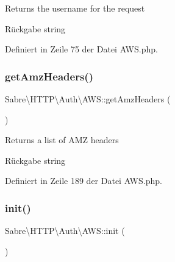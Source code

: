 Returns the username for the request

\begin{DoxyReturn}{Rückgabe}
string 
\end{DoxyReturn}


Definiert in Zeile 75 der Datei A\+W\+S.\+php.

\mbox{\label{class_sabre_1_1_h_t_t_p_1_1_auth_1_1_a_w_s_a05192193b8766a7524dbe902f0e52aba}} 
\subsubsection{\texorpdfstring{get\+Amz\+Headers()}{getAmzHeaders()}}
{\footnotesize\ttfamily Sabre\textbackslash{}\+H\+T\+T\+P\textbackslash{}\+Auth\textbackslash{}\+A\+W\+S\+::get\+Amz\+Headers (\begin{DoxyParamCaption}{ }\end{DoxyParamCaption})\hspace{0.3cm}{\ttfamily [protected]}}

Returns a list of A\+MZ headers

\begin{DoxyReturn}{Rückgabe}
string 
\end{DoxyReturn}


Definiert in Zeile 189 der Datei A\+W\+S.\+php.

\mbox{\label{class_sabre_1_1_h_t_t_p_1_1_auth_1_1_a_w_s_a71edb3d7a3ba008150032d53ccac6766}} 
\subsubsection{\texorpdfstring{init()}{init()}}
{\footnotesize\ttfamily Sabre\textbackslash{}\+H\+T\+T\+P\textbackslash{}\+Auth\textbackslash{}\+A\+W\+S\+::init (\begin{DoxyParamCaption}{ }\end{DoxyParamCaption})}

